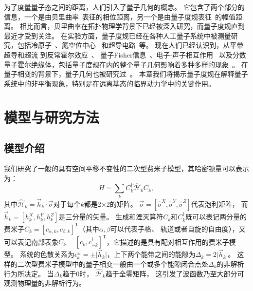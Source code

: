 		为了度量量子态之间的距离，人们引入了量子几何的概念。
		它包含了两个部分的信息，一个是由贝里曲率~\cite{Bohm2003}表征的相位距离，另一个是由量子度规表征~\cite{Provost1980,Matsuura2010,Ma2010b}的幅值距离。
		相比而言，贝里曲率在拓扑物理学背景下已经被深入研究，而量子度规直到最近才受到关注。
		在实验方面，量子度规已经在各种人工量子系统中被测量研究，包括冷原子~\cite{Yi2023}、氮空位中心~\cite{Yu2019} 和超导电路~\cite{Zheng2022}等。
		现在人们已经认识到，从平带超导和超流\cite{Peotta2015,Julku2016,Peotta2023,Tian2023,Espinosa2024} 到反常霍尔效应~\cite{Gianfrate2020,Wang2021,Gao2023}、 量子Fisher信息~\cite{Braunstein1994,Zanardi2007,Hauke2016}、电子-声子相互作用~\cite{Yu2023} 以及分数量子霍尔绝缘体\cite{Parameswaran2013,Neupert2015,BMera2021,BMera20212}，包括量子度规在内的整个量子几何影响着多种多样的现象~\cite{Torma2023}。
		在量子相变的背景下，量子几何也被研究过~\cite{CAROLLO20201}。
		本章我们将揭示量子度规在解释量子系统中的非平衡现象，特别是在远离基态的临界动力学中的关键作用。

	\section{模型与研究方法}
	
		\subsection{模型介绍}
	
			我们研究了一般的具有空间平移不变性的二次型费米子模型，其哈密顿量可以表示为：
			\begin{equation}
				H=\sum_k C^\dagger_k \hat{\mathcal{H}}_k C_k, \label{eq:Ham}
			\end{equation}
			其中$\hat{\mathcal{H}}_k = \vec{h}_k \cdot \vec{\sigma}$对于每个$k$都是2$\times$2的矩阵。
			$\vec{\sigma} = [\hat{\sigma}^X, \hat{\sigma}^Y, \hat{\sigma}^Z]$代表泡利矩阵， 而$\vec{h}_k = [h_k^X, h_k^Y, h_k^Z]$是三分量的矢量。
			生成和湮灭算符$C_k$和$C^\dagger_k$既可以表记两分量的费米子$C_k = [c_{\alpha, k}, c_{\beta, k}]^\text{T}$（其中$\alpha, \beta$可以代表子格、 轨道或者自旋的自由度），又可以表记南部表象$C_k = [c_k, c_{-k}^\dagger]^\text{T}$，它描述的是具有配对相互作用的费米子模型。
			系统的色散关系为$\epsilon_k^{\pm} = \pm \lvert \vec{h}_k \rvert$，上下两个能带之间的能隙为$\Delta_k = 2\lvert \vec{h}_k \rvert$。
			这样的二次型费米子模型中的量子相变一般由一个或多个能隙闭合点处$\Delta_k$的非解析行为所决定。
			当$\Delta_k$趋于0时， $\hat{\mathcal{H}}_k$趋于全零矩阵， 这引发了波函数乃至大部分可观测物理量的非解析行为。
			
